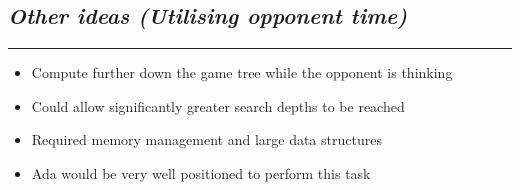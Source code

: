 \documentclass[10pt]{report}
\begin{document}
\begin{multicols}{2}
\section*{\emph{Other ideas (Utilising opponent time)}}
\hrule
    \begin{itemize}
  \item
   	Compute further down the game tree while the opponent is thinking
  \item
	Could allow significantly greater search depths to be reached
  \item
	Required memory management and large data structures
  \item
	Ada would be very well positioned to perform this task
  \end{itemize}

\end{multicols}
\end{document}
